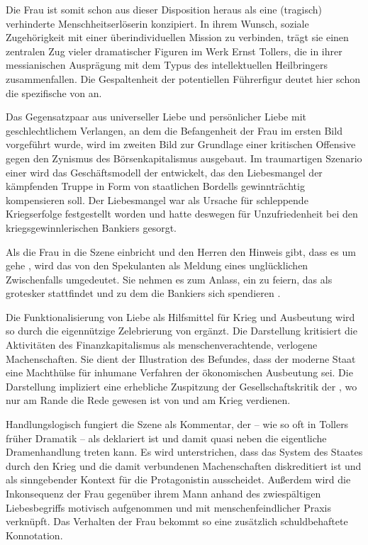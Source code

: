 Die Frau ist somit schon aus dieser Disposition heraus als eine
(tragisch) verhinderte Menschheitserlöserin konzipiert. In ihrem Wunsch,
soziale Zugehörigkeit mit einer überindividuellen Mission zu
verbinden, trägt sie einen zentralen Zug vieler dramatischer Figuren im Werk
Ernst Tollers, die in ihrer messianischen Ausprägung mit dem Typus des
intellektuellen Heilbringers zusammenfallen. Die Gespaltenheit der potentiellen
Führerfigur deutet hier schon die spezifische \Cite{Tragik} von
 an. 


Das Gegensatzpaar aus universeller \Cite{brüderlicher} Liebe und persönlicher
Liebe mit geschlechtlichem Verlangen, an dem die Befangenheit der Frau im
ersten Bild vorgeführt wurde, wird im zweiten Bild zur Grundlage einer kritischen
Offensive gegen den Zynismus des Börsenkapitalismus ausgebaut. Im traumartigen
Szenario einer \Cite{Effektenbörse}  wird das Geschäftsmodell der
\Cite{Kriegserholungsheim A.G.}  entwickelt, das den Liebesmangel der
kämpfenden Truppe in Form von staatlichen Bordells gewinnträchtig kompensieren
soll. Der Liebesmangel war als Ursache für schleppende Kriegserfolge festgestellt
worden und hatte deswegen für Unzufriedenheit bei den kriegsgewinnlerischen
Bankiers gesorgt.

Als die Frau in die Szene einbricht und den Herren den Hinweis
gibt, dass es um \Cite{Menschen} gehe , wird das von den
Spekulanten als
Meldung eines unglücklichen Zwischenfalls umgedeutet. Sie nehmen es zum
Anlass, ein \Cite{Wohltätigkeitsfest} zu feiern, das als grotesker
\Cite{Tanz ums Börsenpult} stattfindet und zu dem die Bankiers
sich \Cite{fünfhundert raffinierte Mädchen} spendieren .

Die Funktionalisierung von Liebe als Hilfsmittel für Krieg und
Ausbeutung wird so durch die eigennützige Zelebrierung von \Cite{Wohltätigkeit} 
ergänzt. Die Darstellung kritisiert die Aktivitäten des Finanzkapitalismus als
menschenverachtende, verlogene Machenschaften. Sie dient der Illustration des
Befundes, dass der moderne Staat eine Machthülse für inhumane Verfahren der
ökonomischen Ausbeutung sei. Die Darstellung impliziert eine erhebliche Zuspitzung
der Gesellschaftskritik der , wo nur am Rande die Rede
gewesen ist von \Cite{Reichen, die prassen}  und am Krieg
verdienen.

Handlungslogisch fungiert die Szene als Kommentar, der -- wie so oft in
Tollers früher Dramatik -- als \Cite{Traumszene} deklariert ist und damit quasi
neben die eigentliche Dramenhandlung treten kann. Es wird unterstrichen, dass
das System des Staates durch den Krieg und die damit verbundenen
Machenschaften diskreditiert ist und als sinngebender Kontext für die
Protagonistin ausscheidet. Außerdem wird die Inkonsequenz der Frau gegenüber
ihrem Mann anhand des zwiespältigen Liebesbegriffs motivisch aufgenommen
und mit menschenfeindlicher Praxis verknüpft. Das \Cite{schamlose} Verhalten
der Frau bekommt so eine zusätzlich schuldbehaftete Konnotation. 

